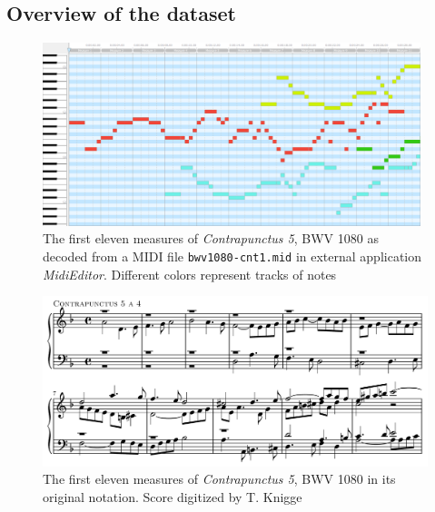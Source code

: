 \documentclass[a4paper, 11pt, twoside]{report}
\theoremstyle{definition}
\begin{document}
\subsection{Overview of the dataset}

\begin{figure}[t]
    \centering
    \includegraphics[width=0.98\textwidth]{assets/midieditor.png}
    \caption{The first eleven measures of \textit{Contrapunctus 5}, BWV 1080 as decoded from a MIDI file \texttt{bwv1080-cnt1.mid} in external application \textit{MidiEditor}. Different colors represent tracks of notes}
    \label{fig:scr_midieditor}
\end{figure}

\begin{figure}[t]
    \centering
    \includegraphics[width=1\textwidth]{assets/bach_sample.png}
    \caption{The first eleven measures of \textit{Contrapunctus 5}, BWV 1080 in its original notation. Score digitized by T. Knigge}
    \label{fig:scr_contra5}
\end{figure}
\end{document}

